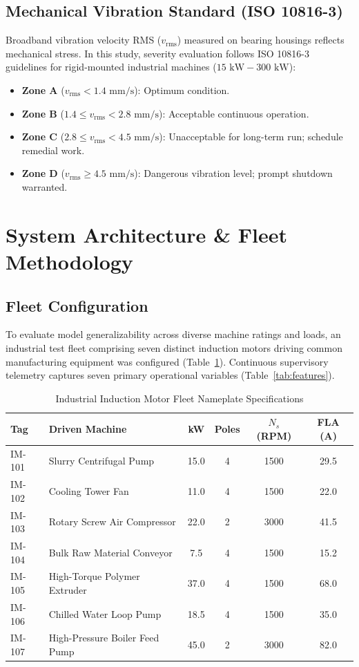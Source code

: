\documentclass[conference]{IEEEtran}
\begin{document}
\subsection{Mechanical Vibration Standard (ISO 10816-3)}
Broadband vibration velocity RMS ($v_{\text{rms}}$) measured on bearing housings reflects mechanical stress. In this study, severity evaluation follows ISO 10816-3 guidelines for rigid-mounted industrial machines ($15\text{ kW} - 300\text{ kW}$):
\begin{itemize}
    \item \textbf{Zone A} ($v_{\text{rms}} < 1.4\text{ mm/s}$): Optimum condition.
    \item \textbf{Zone B} ($1.4 \le v_{\text{rms}} < 2.8\text{ mm/s}$): Acceptable continuous operation.
    \item \textbf{Zone C} ($2.8 \le v_{\text{rms}} < 4.5\text{ mm/s}$): Unacceptable for long-term run; schedule remedial work.
    \item \textbf{Zone D} ($v_{\text{rms}} \ge 4.5\text{ mm/s}$): Dangerous vibration level; prompt shutdown warranted.
\end{itemize}

\section{System Architecture \& Fleet Methodology}

\subsection{Fleet Configuration}
To evaluate model generalizability across diverse machine ratings and loads, an industrial test fleet comprising seven distinct induction motors driving common manufacturing equipment was configured (Table~\ref{tab:fleet}). Continuous supervisory telemetry captures seven primary operational variables (Table~\ref{tab:features}).

\begin{table}[htbp]
\caption{Industrial Induction Motor Fleet Nameplate Specifications}
\label{tab:fleet}
\centering
\begin{tabular}{llcccc}
\toprule
\textbf{Tag} & \textbf{Driven Machine} & \textbf{kW} & \textbf{Poles} & \textbf{$N_s$ (RPM)} & \textbf{FLA (A)} \\
\midrule
IM-101 & Slurry Centrifugal Pump & 15.0 & 4 & 1500 & 29.5 \\
IM-102 & Cooling Tower Fan & 11.0 & 4 & 1500 & 22.0 \\
IM-103 & Rotary Screw Air Compressor & 22.0 & 2 & 3000 & 41.5 \\
IM-104 & Bulk Raw Material Conveyor & 7.5 & 4 & 1500 & 15.2 \\
IM-105 & High-Torque Polymer Extruder & 37.0 & 4 & 1500 & 68.0 \\
IM-106 & Chilled Water Loop Pump & 18.5 & 4 & 1500 & 35.0 \\
IM-107 & High-Pressure Boiler Feed Pump & 45.0 & 2 & 3000 & 82.0 \\
\bottomrule
\end{tabular}
\end{table}
\end{document}
